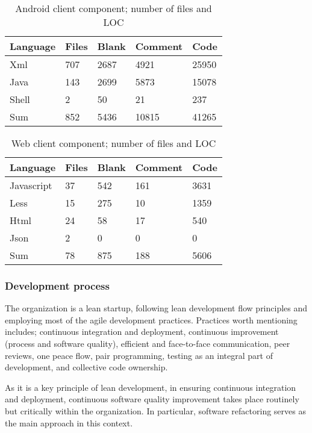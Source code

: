 \begin{table}[ht!]
\centering
\caption{Android client component; number of files and \gls{LOC}}
\label{table:androidLoc}
    \begin{tabular}{ |p{3cm} p{2cm} p{2cm} p{2cm} p{2cm}|  }
     \hline
     Language       &Files  &Blank  &Comment    &Code\\
     \hline\hline
     Xml            &707    &2687   &4921       &25950\\
     Java           &143    &2699   &5873       &15078\\
     Shell          &2      &50     &21         &237\\
     \hline\hline
     Sum            &852    &5436   &10815      &41265\\
     \hline
    \end{tabular}
\end{table}

\begin{table}[ht!]
\centering
\caption{Web client component; number of files and \gls{LOC}}
\label{table:webLoc}
    \begin{tabular}{ |p{3cm} p{2cm} p{2cm} p{2cm} p{2cm}|  }
     \hline
     Language&Files&Blank&Comment&Code\\
     \hline\hline
     Javascript   & 37    &542&   161&3631\\
     Less&   15  & 275   &10 & 1359\\
     Html &24 & 58&  17&540\\
     Json    &2 & 0&  0 & 0\\
     \hline\hline
     Sum&78&875&188&5606\\
     \hline
    \end{tabular}
\end{table}
\subsubsection*{Development process} \label{process}
The organization is a lean startup, following lean development flow principles and employing most of the agile development practices. Practices worth mentioning includes; continuous integration and deployment, continuous improvement (process and software quality), efficient and face-to-face communication, peer reviews, one peace flow, pair programming, testing as an integral part of development, and collective code ownership.

As it is a key principle of lean development, in ensuring continuous integration and deployment, continuous software quality improvement takes place routinely but critically within the organization. In particular, software refactoring serves as the main approach in this context.  

